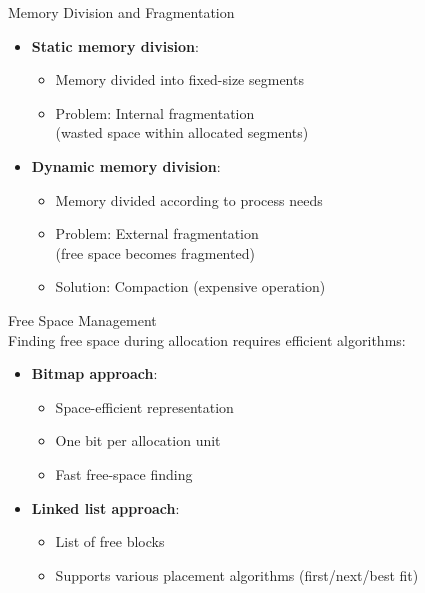 
\begin{definition}{Memory Division and Fragmentation}
    \begin{itemize}
        \item \textbf{Static memory division}:
            \begin{itemize}
                \item Memory divided into fixed-size segments
                \item Problem: Internal fragmentation \\ (wasted space within allocated segments)
            \end{itemize}
        \item \textbf{Dynamic memory division}:
            \begin{itemize}
                \item Memory divided according to process needs
                \item Problem: External fragmentation \\ (free space becomes fragmented)
                \item Solution: Compaction (expensive operation)
            \end{itemize}
    \end{itemize}
\end{definition}



\begin{definition}{Free Space Management}\\
    Finding free space during allocation requires efficient algorithms:
    \begin{itemize}
        \item \textbf{Bitmap approach}:
            \begin{itemize}
                \item Space-efficient representation
                \item One bit per allocation unit
                \item Fast free-space finding
            \end{itemize}
        \item \textbf{Linked list approach}:
            \begin{itemize}
                \item List of free blocks
                \item Supports various placement algorithms (first/next/best fit)
            \end{itemize}
    \end{itemize}
\end{definition}

